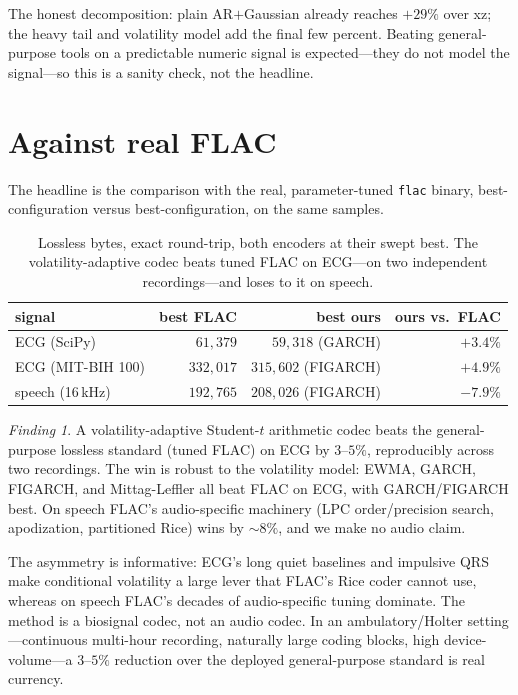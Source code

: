 \documentclass[11pt,reqno]{amsart}
\theoremstyle{plain}
\theoremstyle{remark}
\newtheorem*{finding}{Finding}
\begin{document}
The honest decomposition: plain AR$+$Gaussian already reaches $+29\%$ over xz;
the heavy tail and volatility model add the final few percent. Beating
general-purpose tools on a predictable numeric signal is expected---they do not
model the signal---so this is a sanity check, not the headline.

\section{Against real FLAC}
\label{sec:flac}

The headline is the comparison with the real, parameter-tuned \texttt{flac}
binary, best-configuration versus best-configuration, on the same samples.

\begin{table}[h]
\centering\small
\begin{tabular}{lrrr}
\toprule
signal & best FLAC & best ours & ours vs.\ FLAC\\
\midrule
ECG (SciPy)        & $61{,}379$  & $59{,}318$ (GARCH)   & $\mathbf{+3.4\%}$\\
ECG (MIT-BIH 100)  & $332{,}017$ & $315{,}602$ (FIGARCH)& $\mathbf{+4.9\%}$\\
speech (16\,kHz)   & $192{,}765$ & $208{,}026$ (FIGARCH)& $-7.9\%$\\
\bottomrule
\end{tabular}
\caption{Lossless bytes, exact round-trip, both encoders at their swept best.
The volatility-adaptive codec beats tuned FLAC on ECG---on two independent
recordings---and loses to it on speech.}
\label{tab:flac}
\end{table}

\begin{finding}
A volatility-adaptive Student-$t$ arithmetic codec beats the general-purpose
lossless standard (tuned FLAC) on ECG by $3$--$5\%$, reproducibly across two
recordings. The win is robust to the volatility model: EWMA, GARCH, FIGARCH, and
Mittag-Leffler all beat FLAC on ECG, with GARCH/FIGARCH best. On speech FLAC's
audio-specific machinery (LPC order/precision search, apodization, partitioned
Rice) wins by $\sim8\%$, and we make no audio claim.
\end{finding}

The asymmetry is informative: ECG's long quiet baselines and impulsive QRS make
conditional volatility a large lever that FLAC's Rice coder cannot use, whereas
on speech FLAC's decades of audio-specific tuning dominate. The method is a
biosignal codec, not an audio codec. In an ambulatory/Holter setting---continuous
multi-hour recording, naturally large coding blocks, high device-volume---a
$3$--$5\%$ reduction over the deployed general-purpose standard is real currency.
\end{document}
